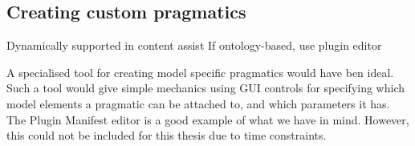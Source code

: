 	\subsection{Creating custom pragmatics}
	Dynamically supported in content assist 
	If ontology-based, use plugin editor
	
A specialised tool for creating model specific pragmatics would have ben ideal.
Such a tool would give simple mechanics using GUI controls for specifying which
model elements a pragmatic can be attached to, and which parameters it has. The
Plugin Manifest editor is a good example of what we have in mind. However, this
could not be included for this thesis due to time constraints.
	
